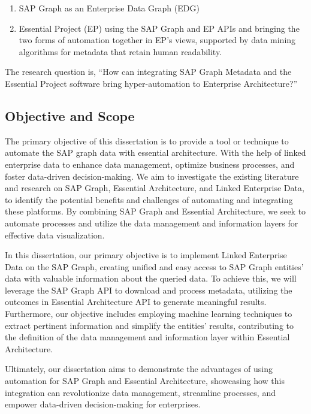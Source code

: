 \documentclass{article}
\begin{document}
\begin{enumerate}
    \item SAP Graph as an Enterprise Data Graph (EDG)
    \item Essential Project (EP) using the SAP Graph and EP APIs and bringing the two forms of automation together in EP's views, supported by data mining algorithms for metadata that retain human readability.
\end{enumerate}

The research question is, “How can integrating SAP Graph Metadata and the Essential Project software bring hyper-automation to Enterprise Architecture?”


\maketitle
\subsection{Objective and Scope}
The primary objective of this dissertation is to provide a tool or technique to automate the SAP graph data with essential architecture. With the help of linked enterprise data to enhance data management, optimize business processes, and foster data-driven decision-making. We aim to investigate the existing literature and research on SAP Graph, Essential Architecture, and Linked Enterprise Data, to identify the potential benefits and challenges of automating and integrating these platforms. By combining SAP Graph and Essential Architecture, we seek to automate processes and utilize the data management and information layers for effective data visualization. 

In this dissertation, our primary objective is to implement Linked Enterprise Data on the SAP Graph, creating unified and easy access to SAP Graph entities' data with valuable information about the queried data. To achieve this, we will leverage the SAP Graph API to download and process metadata, utilizing the outcomes in Essential Architecture API to generate meaningful results. Furthermore, our objective includes employing machine learning techniques to extract pertinent information and simplify the entities' results, contributing to the definition of the data management and information layer within Essential Architecture.

Ultimately, our dissertation aims to demonstrate the advantages of using automation for SAP Graph and Essential Architecture, showcasing how this integration can revolutionize data management, streamline processes, and empower data-driven decision-making for enterprises.
\end{document}
